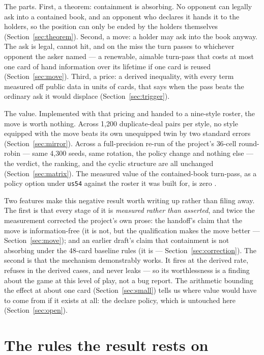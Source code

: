 \documentclass[11pt]{article}
\newcommand{\code}[1]{\texttt{#1}}
\begin{document}
The parts. First, a theorem: containment is absorbing. No opponent can legally
ask into a contained book, and an opponent who declares it hands it to the
holders, so the position can only be ended by the holders themselves
(Section~\ref{sec:theorem}). Second, a move: a holder may ask into the book
anyway. The ask is legal, cannot hit, and on the miss the turn passes to
whichever opponent the asker named --- a renewable, aimable turn-pass that
costs at most one card of hand information over its lifetime if one card is
reused (Section~\ref{sec:move}). Third, a price: a derived inequality, with
every term measured off public data in units of cards, that says when the pass
beats the ordinary ask it would displace (Section~\ref{sec:trigger}).

The value. Implemented with that pricing and handed to a nine-style roster, the
move is worth nothing. Across 1{,}200 duplicate-deal pairs per style, no style
equipped with the move beats its own unequipped twin by two standard errors
(Section~\ref{sec:mirror}). Across a full-precision re-run of the project's
$36$-cell round-robin \cite{v05} --- same 4{,}300 seeds, same rotation, the policy change
and nothing else --- the verdict, the ranking, and the cyclic structure are all
unchanged (Section~\ref{sec:matrix}). The measured value of the contained-book
turn-pass, as a policy option under \code{us54} against the roster it was built
for, is zero \cite{styles}.

Two features make this negative result worth writing up rather than filing
away. The first is that every stage of it is \emph{measured rather than
asserted}, and twice the measurement corrected the project's own prose: the
handoff's claim that the move is information-free (it is not, but the
qualification makes the move better --- Section~\ref{sec:move}); and an earlier
draft's claim that containment is not absorbing under the 48-card baseline
rules (it is --- Section~\ref{sec:correction}). The second is that the
mechanism demonstrably works. It fires at the derived rate, refuses in the
derived cases, and never leaks --- so its worthlessness is a finding about the
game at this level of play, not a bug report. The arithmetic bounding the
effect at about one card (Section~\ref{sec:small}) tells us where value would
have to come from if it exists at all: the declare policy, which is untouched
here (Section~\ref{sec:open}).

\section{The rules the result rests on}
\label{sec:rules}
\end{document}

